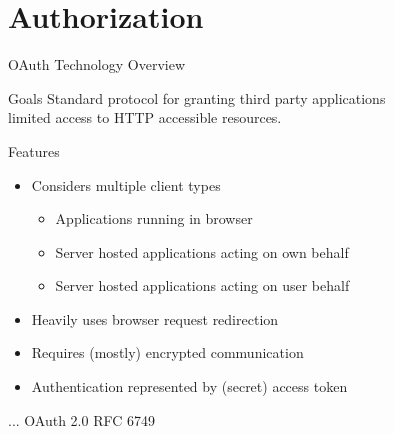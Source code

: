 \section{Authorization}


\begin{frame}{OAuth Technology Overview}
    \begin{block}{Goals}
        Standard protocol for granting third party applications \\ limited access to HTTP accessible resources.
    \end{block}

    \bigskip

    \begin{block}{Features}
        \begin{itemize}
            \item Considers multiple client types
            \begin{itemize}
                \item Applications running in browser
                \item Server hosted applications acting on own behalf
                \item Server hosted applications acting on user behalf
            \end{itemize}
            \item Heavily uses browser request redirection
            \item Requires (mostly) encrypted communication
            \item Authentication represented by (secret) access token
        \end{itemize}
    \end{block}

    \bigskip

    \hfill ... OAuth 2.0 RFC 6749
\end{frame}



